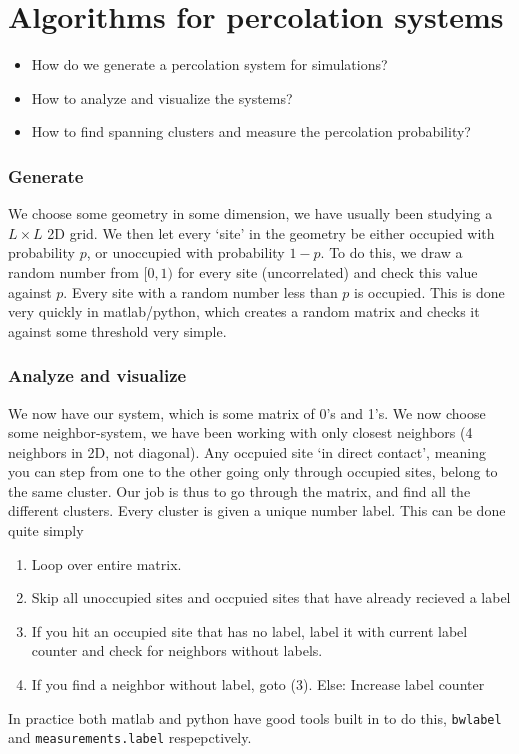 \documentclass[a4paper, 11pt, notitlepage, english]{article}
\begin{document}

\section{Algorithms for percolation systems}
\begin{itemize}
\item How do we generate a percolation system for simulations? 
\item How to analyze and visualize the systems?
\item How to find spanning clusters and measure the percolation probability?
\end{itemize}

\subsubsection*{Generate}

We choose some geometry in some dimension, we have usually been studying a $L\times L$ 2D grid. We then let every `site' in the geometry be either occupied with probability $p$, or unoccupied with probability $1-p$. To do this, we draw a random number from $[0, 1)$ for every site (uncorrelated) and check this value against $p$. Every site with a random number less than $p$ is occupied. This is done very quickly in matlab/python, which creates a random matrix and checks it against some threshold very simple. 

\subsubsection*{Analyze and visualize}

We now have our system, which is some matrix of 0's and 1's. We now choose some neighbor-system, we have been working with only closest neighbors (4 neighbors in 2D, not diagonal). Any occpuied site `in direct contact', meaning you can step from one to the other going only through occupied sites, belong to the same cluster. Our job is thus to go through the matrix, and find all the different clusters. Every cluster is given a unique number label. This can be done quite simply
\begin{enumerate}
	\item Loop over entire matrix. 
	\item Skip all unoccupied sites and occpuied sites that have already recieved a label
	\item If you hit an occupied site that has no label, label it with current label counter and check for neighbors without labels.
	\item If you find a neighbor without label, goto (3). Else: Increase label counter
\end{enumerate}
In practice both matlab and python have good tools built in to do this, \verb+bwlabel+ and \verb+measurements.label+ respepctively.
\end{document}
